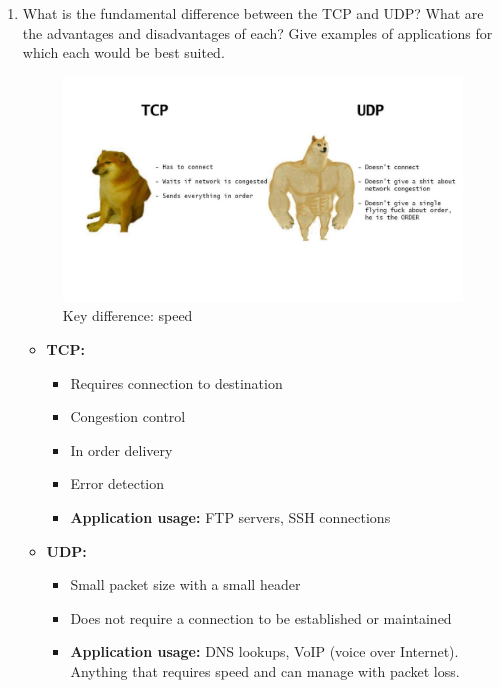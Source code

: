 \documentclass{article}
\begin{document}
\begin{enumerate}
\item What is the fundamental difference between the TCP and UDP? What are the advantages and disadvantages of each? Give examples of applications for which each would be best suited.

\begin{figure}[!h]
\centering
\includegraphics[width=13cm]{UDP_VS_TCP}
\caption{Key difference: speed}
\end{figure}

\begin{itemize}

\item \textbf{TCP:}

\begin{itemize}
\item Requires connection to destination
\item Congestion control
\item In order delivery
\item Error detection
\item \textbf{Application usage:} FTP servers, SSH connections
\end{itemize}

\item \textbf{UDP:}
\begin{itemize}
\item Small packet size with a small header
\item Does not require a connection to be established or maintained
\item \textbf{Application usage:} DNS lookups, VoIP (voice over Internet). Anything that requires speed and can manage with packet loss.
\end{itemize}

\end{itemize}

\end{enumerate}
\end{document}
